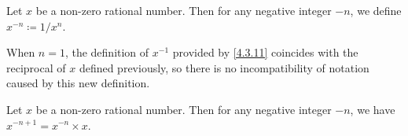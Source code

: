 \begin{defn}\label{4.3.11}
  Let \(x\) be a non-zero rational number.
  Then for any negative integer \(-n\), we define \(x^{-n} \coloneqq 1 / x^n\).
\end{defn}

\begin{note}
  When \(n = 1\), the definition of \(x^{-1}\) provided by \cref{4.3.11} coincides with the reciprocal of \(x\) defined previously, so there is no incompatibility of notation caused by this new definition.
\end{note}

\begin{ac}\label{ac:4.3.2}
  Let \(x\) be a non-zero rational number.
  Then for any negative integer \(-n\), we have \(x^{-n + 1} = x^{-n} \times x\).
\end{ac}

